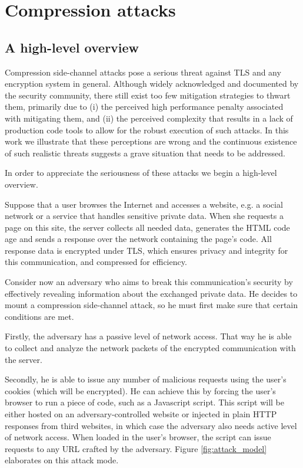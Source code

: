 \section{Compression attacks}\label{sec:attack}

\subsection{A high-level overview}\label{subsec:example}
Compression side-channel attacks pose a serious threat
against TLS and any encryption system in general.
Although widely acknowledged and documented by the security community, there
still exist too few mitigation strategies to thwart them, primarily due to
(i) the perceived high performance penalty associated with mitigating them, and
(ii) the perceived complexity that results in a lack of production code tools to allow for
the robust execution of such attacks. In this work we illustrate that these
perceptions are wrong and the continuous existence of such realistic threats
suggests a grave situation that needs to be addressed.

In order to appreciate the seriousness of these attacks we begin a high-level
overview.

Suppose that a user browses the Internet and accesses a website, e.g. a social
network or a service that handles sensitive private data. When she requests a
page on this site, the server collects all needed data, generates the HTML code
age and sends a response over the network containing the page's code.  All response
data is encrypted under TLS, which ensures privacy and integrity for this
communication, and compressed for efficiency.

Consider now an adversary who aims to break this communication's security by
effectively revealing information about the exchanged private data. He decides
to mount a compression side-channel attack, so he must first make sure that
certain conditions are met.

Firstly, the adversary has a passive level of network access. That way he is
able to collect and analyze the network packets of the encrypted communication
with the server.

Secondly, he is able to issue any number of malicious requests using the user's
cookies (which will be encrypted). He can achieve this by forcing the user's
browser to run a piece of code, such as a Javascript script. This script will be
either hosted on an adversary-controlled website or injected in plain HTTP
responses from third websites, in which case the adversary also needs active
level of network access. When loaded in the user's browser, the script
can issue requests to any URL crafted by the adversary. Figure
\ref{fig:attack_model} elaborates on this attack mode.

